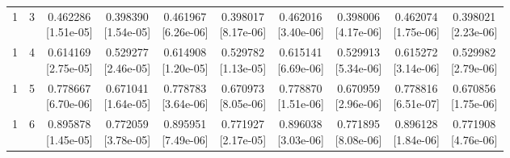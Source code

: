 \documentclass[12pt,letterpaper]{article}
\theoremstyle{plain}
\theoremstyle{definition}
\begin{document}
\begin{table}[p]
\begin{adjustbox}{max width=\linewidth}
\begin{tabular}{@{}rr*{8}{c}@{}}
1 & 3 & \shortstack{0.462286\\[-1pt]{\scriptsize[1.51e-05]}} & \shortstack{0.398390\\[-1pt]{\scriptsize[1.54e-05]}} & \shortstack{0.461967\\[-1pt]{\scriptsize[6.26e-06]}} & \shortstack{0.398017\\[-1pt]{\scriptsize[8.17e-06]}} & \shortstack{0.462016\\[-1pt]{\scriptsize[3.40e-06]}} & \shortstack{0.398006\\[-1pt]{\scriptsize[4.17e-06]}} & \shortstack{0.462074\\[-1pt]{\scriptsize[1.75e-06]}} & \shortstack{0.398021\\[-1pt]{\scriptsize[2.23e-06]}}\\
1 & 4 & \shortstack{0.614169\\[-1pt]{\scriptsize[2.75e-05]}} & \shortstack{0.529277\\[-1pt]{\scriptsize[2.46e-05]}} & \shortstack{0.614908\\[-1pt]{\scriptsize[1.20e-05]}} & \shortstack{0.529782\\[-1pt]{\scriptsize[1.13e-05]}} & \shortstack{0.615141\\[-1pt]{\scriptsize[6.69e-06]}} & \shortstack{0.529913\\[-1pt]{\scriptsize[5.34e-06]}} & \shortstack{0.615272\\[-1pt]{\scriptsize[3.14e-06]}} & \shortstack{0.529982\\[-1pt]{\scriptsize[2.79e-06]}}\\
1 & 5 & \shortstack{0.778667\\[-1pt]{\scriptsize[6.70e-06]}} & \shortstack{0.671041\\[-1pt]{\scriptsize[1.64e-05]}} & \shortstack{0.778783\\[-1pt]{\scriptsize[3.64e-06]}} & \shortstack{0.670973\\[-1pt]{\scriptsize[8.05e-06]}} & \shortstack{0.778870\\[-1pt]{\scriptsize[1.51e-06]}} & \shortstack{0.670959\\[-1pt]{\scriptsize[2.96e-06]}} & \shortstack{0.778816\\[-1pt]{\scriptsize[6.51e-07]}} & \shortstack{0.670856\\[-1pt]{\scriptsize[1.75e-06]}}\\
1 & 6 & \shortstack{0.895878\\[-1pt]{\scriptsize[1.45e-05]}} & \shortstack{0.772059\\[-1pt]{\scriptsize[3.78e-05]}} & \shortstack{0.895951\\[-1pt]{\scriptsize[7.49e-06]}} & \shortstack{0.771927\\[-1pt]{\scriptsize[2.17e-05]}} & \shortstack{0.896038\\[-1pt]{\scriptsize[3.03e-06]}} & \shortstack{0.771895\\[-1pt]{\scriptsize[8.08e-06]}} & \shortstack{0.896128\\[-1pt]{\scriptsize[1.84e-06]}} & \shortstack{0.771908\\[-1pt]{\scriptsize[4.76e-06]}}\\

\end{tabular}
\end{adjustbox}
\end{table}
\end{document}
